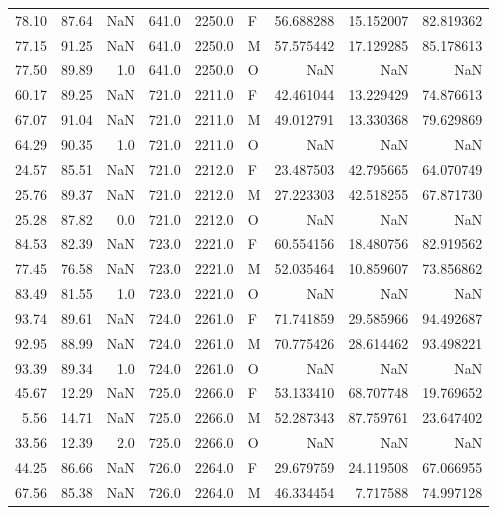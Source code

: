 \begin{table}
\begin{tabular}{rrrrrlrrr}
78.10 &  87.64 &      NaN &  641.0 & 2250.0 &      F & 56.688288 & 15.152007 & 82.819362 \\
77.15 &  91.25 &      NaN &  641.0 & 2250.0 &      M & 57.575442 & 17.129285 & 85.178613 \\
77.50 &  89.89 &      1.0 &  641.0 & 2250.0 &      O &       NaN &       NaN &       NaN \\
60.17 &  89.25 &      NaN &  721.0 & 2211.0 &      F & 42.461044 & 13.229429 & 74.876613 \\
67.07 &  91.04 &      NaN &  721.0 & 2211.0 &      M & 49.012791 & 13.330368 & 79.629869 \\
64.29 &  90.35 &      1.0 &  721.0 & 2211.0 &      O &       NaN &       NaN &       NaN \\
24.57 &  85.51 &      NaN &  721.0 & 2212.0 &      F & 23.487503 & 42.795665 & 64.070749 \\
25.76 &  89.37 &      NaN &  721.0 & 2212.0 &      M & 27.223303 & 42.518255 & 67.871730 \\
25.28 &  87.82 &      0.0 &  721.0 & 2212.0 &      O &       NaN &       NaN &       NaN \\
84.53 &  82.39 &      NaN &  723.0 & 2221.0 &      F & 60.554156 & 18.480756 & 82.919562 \\
77.45 &  76.58 &      NaN &  723.0 & 2221.0 &      M & 52.035464 & 10.859607 & 73.856862 \\
83.49 &  81.55 &      1.0 &  723.0 & 2221.0 &      O &       NaN &       NaN &       NaN \\
93.74 &  89.61 &      NaN &  724.0 & 2261.0 &      F & 71.741859 & 29.585966 & 94.492687 \\
92.95 &  88.99 &      NaN &  724.0 & 2261.0 &      M & 70.775426 & 28.614462 & 93.498221 \\
93.39 &  89.34 &      1.0 &  724.0 & 2261.0 &      O &       NaN &       NaN &       NaN \\
45.67 &  12.29 &      NaN &  725.0 & 2266.0 &      F & 53.133410 & 68.707748 & 19.769652 \\
 5.56 &  14.71 &      NaN &  725.0 & 2266.0 &      M & 52.287343 & 87.759761 & 23.647402 \\
33.56 &  12.39 &      2.0 &  725.0 & 2266.0 &      O &       NaN &       NaN &       NaN \\
44.25 &  86.66 &      NaN &  726.0 & 2264.0 &      F & 29.679759 & 24.119508 & 67.066955 \\
67.56 &  85.38 &      NaN &  726.0 & 2264.0 &      M & 46.334454 &  7.717588 & 74.997128 \\

\end{tabular}
\end{table}
